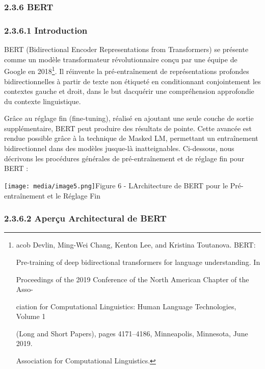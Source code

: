 \documentclass[
]{article}
\begin{document}
\subsubsection{\texorpdfstring{2.3.6 BERT }{2.3.6 BERT }}\label{bert}

\subsubsection{\texorpdfstring{2.3.6.1 Introduction
}{2.3.6.1 Introduction }}\label{introduction-5}

BERT (Bidirectional Encoder Representations from Transformers) se
présente comme un modèle transformateur révolutionnaire conçu par une
équipe de Google en 2018\footnote{acob Devlin, Ming-Wei Chang, Kenton
  Lee, and Kristina Toutanova. BERT:

  Pre-training of deep bidirectional transformers for language
  understanding. In

  Proceedings of the 2019 Conference of the North American Chapter of
  the Asso-

  ciation for Computational Linguistics: Human Language Technologies,
  Volume 1

  (Long and Short Papers), pages 4171--4186, Minneapolis, Minnesota,
  June 2019.

  Association for Computational Linguistics.}. Il réinvente la
pré-entraînement de représentations profondes bidirectionnelles à partir
de texte non étiqueté en conditionnant conjointement les contextes
gauche et droit, dans le but d\textquotesingle acquérir une
compréhension approfondie du contexte linguistique.

Grâce au réglage fin (fine-tuning), réalisé en ajoutant une seule couche
de sortie supplémentaire, BERT peut produire des résultats de pointe.
Cette avancée est rendue possible grâce à la technique de Masked LM,
permettant un entraînement bidirectionnel dans des modèles jusque-là
inatteignables. Ci-dessous, nous décrivons les procédures générales de
pré-entraînement et de réglage fin pour BERT :

\texttt{[image: media/image5.png]}Figure 6
- L\textquotesingle Architecture de BERT pour le Pré-entraînement et le
Réglage Fin

\subsubsection{\texorpdfstring{2.3.6.2 Aperçu Architectural de BERT
}{2.3.6.2 Aperçu Architectural de BERT }}\label{aperuxe7u-architectural-de-bert}
\end{document}
